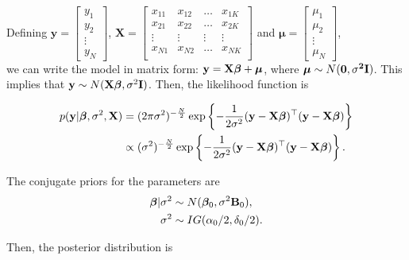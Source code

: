 Defining $\mathbf{y}=\begin{bmatrix} y_1\\ y_2\\ \vdots \\ y_N \end{bmatrix}$, $\mathbf{X}=\begin{bmatrix} x_{11} & x_{12} & \ldots & x_{1K}\\ x_{21} & x_{22} & \ldots & x_{2K}\\ \vdots & \vdots & \vdots & \vdots\\ x_{N1} & x_{N2} & \ldots & x_{NK}\\ \end{bmatrix}$ and $\bm{\mu}=\begin{bmatrix} \mu_1\\ \mu_2\\ \vdots \\ \mu_N \end{bmatrix}$,\\

we can write the model in matrix form: ${\bf{y}}={\bf{X}}\bm{\beta}+\bm{\mu}$, where $\bm{\mu}\sim N(\bf{0},\sigma^2{\bf{I}})$. This implies that ${\bf{y}}\sim N({\bf{X}}\bm{\beta},\sigma^2\bf{I})$. Then, the likelihood function is

\begin{align*}
	p({\bf{y}}|\bm{\beta}, \sigma^2, {{\bf{X}}}) & = (2\pi\sigma^2)^{-\frac{N}{2}} \exp \left\{-\frac{1}{2\sigma^2} ({\bf{y}} - {\bf{X}}\bm{\beta})^{\top}({\bf{y}} - {\bf{X}}\bm{\beta}) \right\}  \\
	& \propto (\sigma^2)^{-\frac{N}{2}} \exp \left\{-\frac{1}{2\sigma^2} ({\bf{y}} - {\bf{X}}\bm{\beta})^{\top}({\bf{y}} - {\bf{X}}\bm{\beta}) \right\}.
\end{align*}

The conjugate priors for the parameters are
\begin{align*}
	\bm{\beta}|\sigma^2 & \sim N(\bm{\beta}_0, \sigma^2 {\bf{B}}_0),\\
	\sigma^2 & \sim IG(\alpha_0/2, \delta_0/2).
\end{align*}

Then, the posterior distribution is

